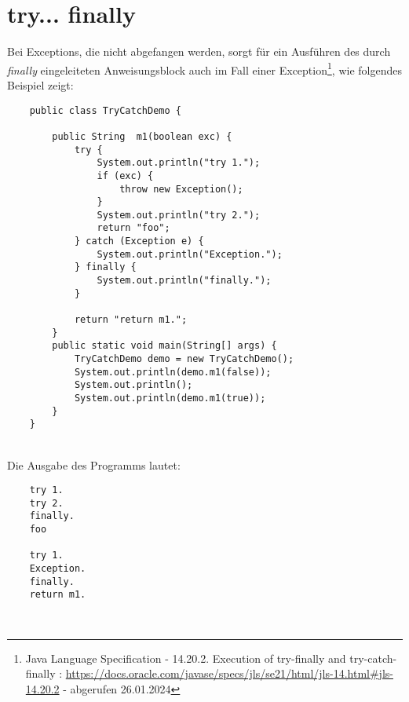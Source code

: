 \section{try... finally}

Bei Exceptions, die nicht abgefangen werden, sorgt  für ein Ausführen des durch \textit{finally} eingeleiteten Anweisungsblock auch im Fall einer Exception\footnote{
    Java Language Specification - 14.20.2. Execution of try-finally and try-catch-finally : \url{https://docs.oracle.com/javase/specs/jls/se21/html/jls-14.html#jls-14.20.2} - abgerufen 26.01.2024
}, wie folgendes Beispiel zeigt:

\begin{verbatim}
    public class TryCatchDemo {

        public String  m1(boolean exc) {
            try {
                System.out.println("try 1.");
                if (exc) {
                    throw new Exception();
                }
                System.out.println("try 2.");
                return "foo";
            } catch (Exception e) {
                System.out.println("Exception.");
            } finally {
                System.out.println("finally.");
            }

            return "return m1.";
        }
        public static void main(String[] args) {
            TryCatchDemo demo = new TryCatchDemo();
            System.out.println(demo.m1(false));
            System.out.println();
            System.out.println(demo.m1(true));
        }
    }
\end{verbatim}\\

\noindent
Die Ausgabe des Programms lautet:


\noindent
\begin{verbatim}
    try 1.
    try 2.
    finally.
    foo

    try 1.
    Exception.
    finally.
    return m1.
\end{verbatim}\\